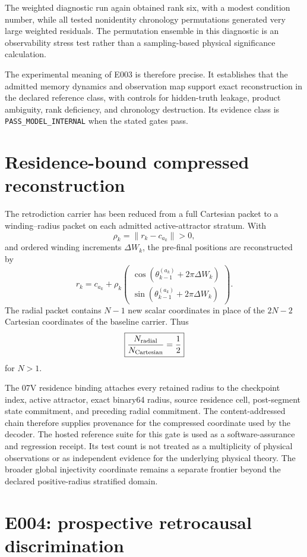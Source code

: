 The weighted diagnostic run again obtained rank six, with a modest condition number, while all tested nonidentity chronology permutations generated very large weighted residuals. The permutation ensemble in this diagnostic is an observability stress test rather than a sampling-based physical significance calculation.

The experimental meaning of E003 is therefore precise. It establishes that the admitted memory dynamics and observation map support exact reconstruction in the declared reference class, with controls for hidden-truth leakage, product ambiguity, rank deficiency, and chronology destruction. Its evidence class is \texttt{PASS\_MODEL\_INTERNAL} when the stated gates pass.

\section{Residence-bound compressed reconstruction}

The retrodiction carrier has been reduced from a full Cartesian packet to a winding--radius packet on each admitted active-attractor stratum. With
\[
\rho_k=\|r_k-c_{a_k}\|>0,
\]
and ordered winding increments \(\Delta W_k\), the pre-final positions are reconstructed by
\[
r_k=c_{a_k}+\rho_k
\begin{pmatrix}
\cos(\theta_{k-1}^{(a_k)}+2\pi\Delta W_k)\\
\sin(\theta_{k-1}^{(a_k)}+2\pi\Delta W_k)
\end{pmatrix}.
\]
The radial packet contains \(N-1\) new scalar coordinates in place of the \(2N-2\) Cartesian coordinates of the baseline carrier. Thus
\[
\boxed{
\frac{N_{\rm radial}}{N_{\rm Cartesian}}=\frac12
}
\]
for \(N>1\).

The 07V residence binding attaches every retained radius to the checkpoint index, active attractor, exact binary64 radius, source residence cell, post-segment state commitment, and preceding radial commitment. The content-addressed chain therefore supplies provenance for the compressed coordinate used by the decoder. The hosted reference suite for this gate is used as a software-assurance and regression receipt. Its test count is not treated as a multiplicity of physical observations or as independent evidence for the underlying physical theory. The broader global injectivity coordinate remains a separate frontier beyond the declared positive-radius stratified domain.

\section{E004: prospective retrocausal discrimination}

